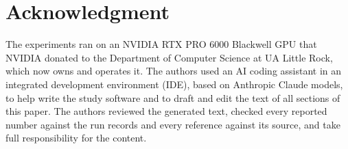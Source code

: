 \documentclass[conference]{IEEEtran}
\begin{document}
\section*{Acknowledgment}
The experiments ran on an NVIDIA RTX PRO 6000 Blackwell GPU that NVIDIA donated to the Department of Computer
Science at UA Little Rock, which now owns and operates it.
The authors used an AI coding assistant in an integrated development environment (IDE), based on Anthropic Claude
models, to help write the study software and to draft and edit the text of all sections of this paper. The authors reviewed the generated text, checked every reported
number against the run records and every reference against its source, and take full responsibility for the
content.



\end{document}

